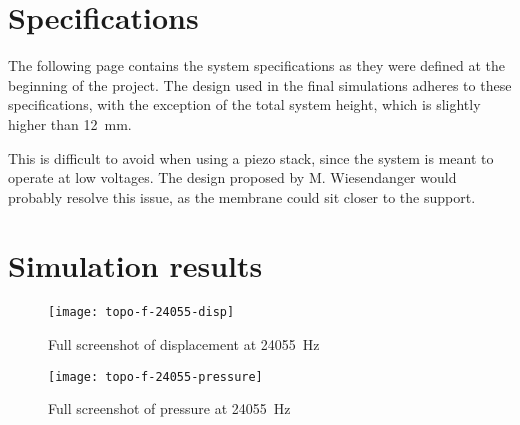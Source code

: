 \section{Specifications}
\label{sec:specs}

The following page contains the system specifications as they were defined at
the beginning of the project. The design used in the final simulations adheres
to these specifications, with the exception of the total system height, which is
slightly higher than \SI{12}{\milli\metre}.

This is difficult to avoid when using a piezo stack, since the system is meant
to operate at low voltages. The design proposed by M. Wiesendanger
\cite{wiesendanger2001} would probably resolve this issue, as the membrane could
sit closer to the support.



\section{Simulation results}
\label{sec:simulation-results}

\begin{figure}[!h]
  \begin{center}
    \texttt{[image: topo-f-24055-disp]}
  \end{center}
  \caption{Full screenshot of displacement at \SI{24055}{\hertz}}
  \label{fig:full-displacement}
\end{figure}

\begin{figure}[!h]
  \begin{center}
    \texttt{[image: topo-f-24055-pressure]}
  \end{center}
  \caption{Full screenshot of pressure at \SI{24055}{\hertz}}
  \label{fig:full-pressure}
\end{figure}
